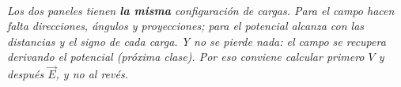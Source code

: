 \begin{center}
\\[0.5em]
{\small\itshape Los dos paneles tienen \textbf{la misma} configuración de
cargas. Para el campo hacen falta direcciones, ángulos y proyecciones; para el
potencial alcanza con las distancias y el signo de cada carga. Y no se pierde
nada: el campo se recupera derivando el potencial (próxima clase). Por eso
conviene calcular primero $V$ y después $\vec E$, y no al revés.}
\end{center}
